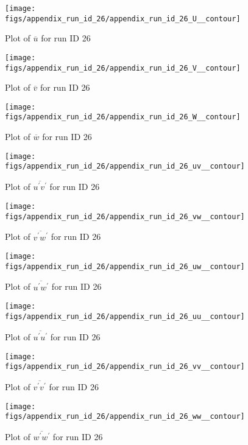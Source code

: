 \begin{figure}[H]
\centering
\texttt{[image: figs/appendix\_run\_id\_26/appendix\_run\_id\_26\_U\_\_contour]}
\caption{Plot of $\overline{u}$ for run ID 26}
\label{fig:appendix_run_id_26_U__contour}
\end{figure}


\begin{figure}[H]
\centering
\texttt{[image: figs/appendix\_run\_id\_26/appendix\_run\_id\_26\_V\_\_contour]}
\caption{Plot of $\overline{v}$ for run ID 26}
\label{fig:appendix_run_id_26_V__contour}
\end{figure}


\begin{figure}[H]
\centering
\texttt{[image: figs/appendix\_run\_id\_26/appendix\_run\_id\_26\_W\_\_contour]}
\caption{Plot of $\overline{w}$ for run ID 26}
\label{fig:appendix_run_id_26_W__contour}
\end{figure}


\begin{figure}[H]
\centering
\texttt{[image: figs/appendix\_run\_id\_26/appendix\_run\_id\_26\_uv\_\_contour]}
\caption{Plot of $\overline{u^\prime v^\prime}$ for run ID 26}
\label{fig:appendix_run_id_26_uv__contour}
\end{figure}


\begin{figure}[H]
\centering
\texttt{[image: figs/appendix\_run\_id\_26/appendix\_run\_id\_26\_vw\_\_contour]}
\caption{Plot of $\overline{v^\prime w^\prime}$ for run ID 26}
\label{fig:appendix_run_id_26_vw__contour}
\end{figure}


\begin{figure}[H]
\centering
\texttt{[image: figs/appendix\_run\_id\_26/appendix\_run\_id\_26\_uw\_\_contour]}
\caption{Plot of $\overline{u^\prime w^\prime}$ for run ID 26}
\label{fig:appendix_run_id_26_uw__contour}
\end{figure}


\begin{figure}[H]
\centering
\texttt{[image: figs/appendix\_run\_id\_26/appendix\_run\_id\_26\_uu\_\_contour]}
\caption{Plot of $\overline{u^\prime u^\prime}$ for run ID 26}
\label{fig:appendix_run_id_26_uu__contour}
\end{figure}


\begin{figure}[H]
\centering
\texttt{[image: figs/appendix\_run\_id\_26/appendix\_run\_id\_26\_vv\_\_contour]}
\caption{Plot of $\overline{v^\prime v^\prime}$ for run ID 26}
\label{fig:appendix_run_id_26_vv__contour}
\end{figure}


\begin{figure}[H]
\centering
\texttt{[image: figs/appendix\_run\_id\_26/appendix\_run\_id\_26\_ww\_\_contour]}
\caption{Plot of $\overline{w^\prime w^\prime}$ for run ID 26}
\label{fig:appendix_run_id_26_ww__contour}
\end{figure}


